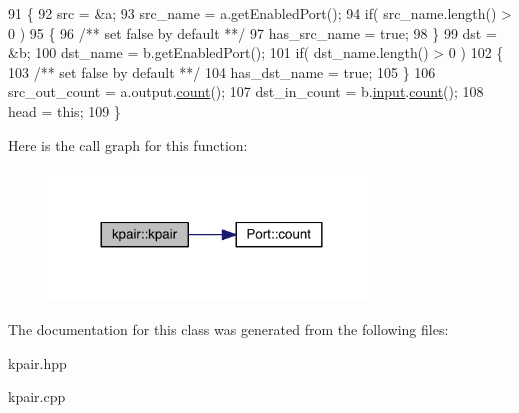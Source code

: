 \begin{DoxyCode}
91 \{
92     src = &a;
93     src\_name = a.getEnabledPort();
94     \textcolor{keywordflow}{if}( src\_name.length() > 0 )
95     \{\textcolor{comment}{}
96 \textcolor{comment}{        /** set false by default **/}
97         has\_src\_name = \textcolor{keyword}{true};
98     \}
99     dst = &b;
100     dst\_name = b.getEnabledPort();
101     \textcolor{keywordflow}{if}( dst\_name.length() > 0 )
102     \{\textcolor{comment}{}
103 \textcolor{comment}{        /** set false by default **/}
104         has\_dst\_name = \textcolor{keyword}{true};
105     \}
106     src\_out\_count = a.output.\hyperlink{class_port_a33562ea87ac7e83a32441da40cbd9279}{count}();
107     dst\_in\_count  = b.\hyperlink{classraft_1_1kernel_a6edbe35a56409d402e719b3ac36d6554}{input}.\hyperlink{class_port_a33562ea87ac7e83a32441da40cbd9279}{count}();
108     head = \textcolor{keyword}{this};
109 \}
\end{DoxyCode}
Here is the call graph for this function\+:
\nopagebreak
\begin{figure}[H]
\begin{center}
\leavevmode
\includegraphics[width=245pt]{classkpair_a7ff7f76ea14d66007a4506c23bd235fc_cgraph}
\end{center}
\end{figure}


The documentation for this class was generated from the following files\+:\begin{DoxyCompactItemize}
\item 
kpair.\+hpp\item 
kpair.\+cpp\end{DoxyCompactItemize}
